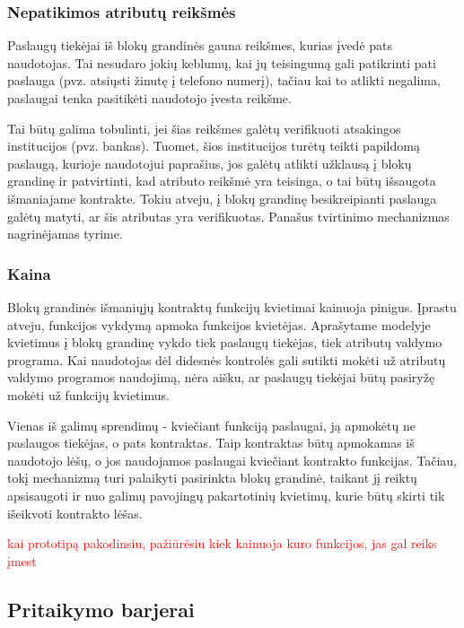 \subsubsection{Nepatikimos atributų reikšmės}

Paslaugų tiekėjai iš blokų grandinės gauna reikšmes, kurias įvedė pats naudotojas. Tai nesudaro jokių keblumų,
kai jų teisingumą gali patikrinti pati paslauga (pvz. atsiųsti žinutę į telefono numerį), tačiau kai to atlikti negalima,
paslaugai tenka pasitikėti naudotojo įvesta reikšme.

Tai būtų galima tobulinti, jei šias reikšmes galėtų verifikuoti
atsakingos institucijos (pvz. bankas). Tuomet, šios institucijos turėtų teikti papildomą paslaugą, kurioje naudotojui
paprašius, jos galėtų atlikti užklausą į blokų grandinę ir patvirtinti, kad atributo reikšmė yra teisinga, o tai būtų
išsaugota išmaniajame kontrakte. Tokiu atveju,
į blokų grandinę besikreipianti paslauga galėtų matyti, ar šis atributas yra verifikuotas. Panašus tvirtinimo mechanizmas
nagrinėjamas \cite{Baars2016} tyrime.

\subsubsection{Kaina}

Blokų grandinės išmaniųjų kontraktų funkcijų kvietimai kainuoja pinigus. Įprastu atveju, funkcijos vykdymą apmoka
funkcijos kvietėjas.
Aprašytame modelyje kvietimus į blokų grandinę vykdo tiek paslaugų tiekėjas, tiek atributų valdymo programa. Kai naudotojas dėl didesnės kontrolės
gali sutikti mokėti už atributų valdymo programos naudojimą, nėra aišku, ar paslaugų tiekėjai būtų pasiryžę mokėti už funkcijų kvietimus.

Vienas iš galimų sprendimų - kviečiant funkciją paslaugai, ją apmokėtų ne paslaugos tiekėjas, o pats kontraktas. Taip
kontraktas būtų apmokamas iš naudotojo lėšų, o jos naudojamos paslaugai kviečiant kontrakto funkcijas.
Tačiau, tokį mechanizmą turi palaikyti pasirinkta blokų grandinė, taikant jį reiktų apsisaugoti ir nuo
galimų pavojingų pakartotinių kvietimų, kurie būtų skirti tik išeikvoti kontrakto lėšas.

\textcolor{red}{kai prototipą pakodinsiu, pažiūrėsiu kiek kainuoja kuro funkcijos, jas gal reiks įmest}

\subsection{Pritaikymo barjerai}

